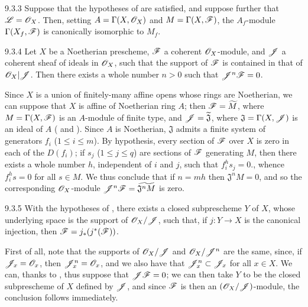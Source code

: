 \documentclass{book}
\begin{document}
\begin{envs}[Corollary]{9.3.3}
\label{cor-1.9.3.3}
Suppose that the hypotheses of  are satisfied, and suppose further that
$\mathscr{L}=\mathscr{O}_X$. Then, setting $A=\Gamma(X,\mathscr{O}_X)$ and $M=\Gamma(X,\mathscr{F})$,
the $A_f$-module $\Gamma(X_f,\mathscr{F})$ is canonically isomorphic to $M_f$.
\end{envs}

\begin{envs}[Proposition]{9.3.4}
\label{prop-1.9.3.4}
Let $X$ be a Noetherian prescheme, $\mathscr{F}$ a coherent $\mathscr{O}_X$-module, and $\mathscr{J}$ a
coherent sheaf of ideals in $\mathscr{O}_X$, such that the support of $\mathscr{F}$ is contained in that
of $\mathscr{O}_X|\mathscr{J}$. Then there exists a whole number $n>0$ such that $\mathscr{J}^n\mathscr{F}=0$.
\end{envs}

Since $X$ is a union of finitely-many affine opens whose rings are Noetherian, we can suppose
that $X$ is affine of Noetherian ring $A$; then $\mathscr{F}=\widetilde{M}$, where
$M=\Gamma(X,\mathscr{F})$ is an $A$-module of finite type, and $\mathscr{J}=\widetilde{\mathfrak{J}}$,
where $\mathfrak{J}=\Gamma(X,\mathscr{J})$ is an ideal of $A$ ( and ).
Since $A$ is Noetherian, $\mathfrak{J}$ admits a finite system of generators $f_i$ ($1\leq i\leq m$).
By hypothesis, every section of $\mathscr{F}$ over $X$ is zero in each of the $D(f_i)$; if $s_j$
($1\leq j\leq q$) are sections of $\mathscr{F}$ generating $M$, then there exists a whole number
$h$, independent of $i$ and $j$, such that $f_i^h s_j=0$., whence $f_i^h s=0$ for all
$s\in M$. We thus conclude that if $n=mh$ then $\mathfrak{J}^n M=0$, and so the corresponding
$\mathscr{O}_X$-module $\mathscr{J}^n\mathscr{F}=\widetilde{\mathfrak{J}^n M}$  is zero.

\begin{envs}[Corollary]{9.3.5}
\label{cor-1.9.3.5}
With the hypotheses of , there exists a closed subprescheme $Y$ of $X$, whose
underlying space is the support of $\mathscr{O}_X/\mathscr{J}$, such that, if $j\colon Y\to X$ is the canonical
injection, then $\mathscr{F}=j_\ast(j^\ast(\mathscr{F}))$.
\end{envs}

First of all, note that the supports of $\mathscr{O}_X/\mathscr{J}$ and $\mathscr{O}_X/\mathscr{J}^n$ are the same,
since, if $\mathscr{J}_x=\mathscr{O}_x$, then $\mathscr{J}_x^n=\mathscr{O}_x$, and we also have that
$\mathscr{J}_x^n\subset\mathscr{J}_x$ for all $x\in X$. We can, thanks to , thus
suppose that $\mathscr{J}\mathscr{F}=0$; we can then take $Y$ to be the closed subprescheme of $X$
defined by $\mathscr{J}$, and since $\mathscr{F}$ is then an $(\mathscr{O}_X/\mathscr{J})$-module, the conclusion
follows immediately.
\end{document}
